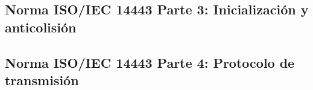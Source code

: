 \subsection{Norma ISO/IEC 14443 Parte 3: Inicialización y anticolisión}
\label{sec:Norma14443-3}


\subsection{Norma ISO/IEC 14443 Parte 4: Protocolo de transmisión}
\label{sec:Norma14443-4}



